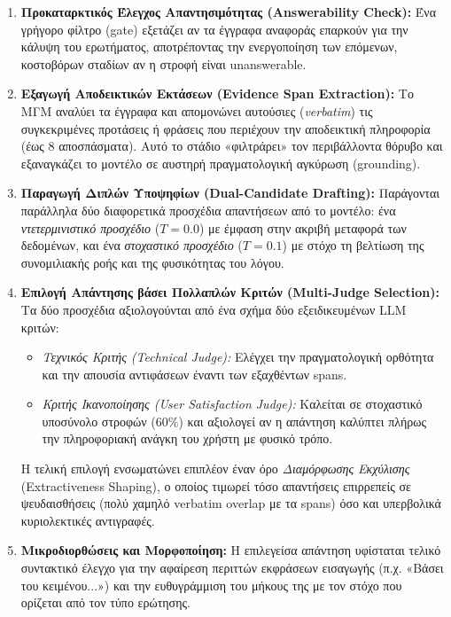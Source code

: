 \begin{enumerate}
    \item \textbf{Προκαταρκτικός Έλεγχος Απαντησιμότητας (Answerability Check):} Ένα γρήγορο φίλτρο (gate) εξετάζει αν τα έγγραφα αναφοράς επαρκούν για την κάλυψη του ερωτήματος, αποτρέποντας την ενεργοποίηση των επόμενων, κοστοβόρων σταδίων αν η στροφή είναι unanswerable.
    \item \textbf{Εξαγωγή Αποδεικτικών Εκτάσεων (Evidence Span Extraction):} Το ΜΓΜ αναλύει τα έγγραφα και απομονώνει αυτούσιες (\textit{verbatim}) τις συγκεκριμένες προτάσεις ή φράσεις που περιέχουν την αποδεικτική πληροφορία (έως 8 αποσπάσματα). Αυτό το στάδιο «φιλτράρει» τον περιβάλλοντα θόρυβο και εξαναγκάζει το μοντέλο σε αυστηρή πραγματολογική αγκύρωση (grounding).
    \item \textbf{Παραγωγή Διπλών Υποψηφίων (Dual-Candidate Drafting):} Παράγονται παράλληλα δύο διαφορετικά προσχέδια απαντήσεων από το μοντέλο: ένα \textit{ντετερμινιστικό προσχέδιο} ($T{=}0.0$) με έμφαση στην ακριβή μεταφορά των δεδομένων, και ένα \textit{στοχαστικό προσχέδιο} ($T{=}0.1$) με στόχο τη βελτίωση της συνομιλιακής ροής και της φυσικότητας του λόγου.
    \item \textbf{Επιλογή Απάντησης βάσει Πολλαπλών Κριτών (Multi-Judge Selection):} Τα δύο προσχέδια αξιολογούνται από ένα σχήμα δύο εξειδικευμένων LLM κριτών:
    \begin{itemize}
        \item \textit{Τεχνικός Κριτής (Technical Judge):} Ελέγχει την πραγματολογική ορθότητα και την απουσία αντιφάσεων έναντι των εξαχθέντων spans.
        \item \textit{Κριτής Ικανοποίησης (User Satisfaction Judge):} Καλείται σε στοχαστικό υποσύνολο στροφών ($60\%$) και αξιολογεί αν η απάντηση καλύπτει πλήρως την πληροφοριακή ανάγκη του χρήστη με φυσικό τρόπο.
    \end{itemize}
    Η τελική επιλογή ενσωματώνει επιπλέον έναν όρο \textit{Διαμόρφωσης Εκχύλισης} (Extractiveness Shaping), ο οποίος τιμωρεί τόσο απαντήσεις επιρρεπείς σε ψευδαισθήσεις (πολύ χαμηλό verbatim overlap με τα spans) όσο και υπερβολικά κυριολεκτικές αντιγραφές.
    \item \textbf{Μικροδιορθώσεις και Μορφοποίηση:} Η επιλεγείσα απάντηση υφίσταται τελικό συντακτικό έλεγχο για την αφαίρεση περιττών εκφράσεων εισαγωγής (π.χ. «Βάσει του κειμένου...») και την ευθυγράμμιση του μήκους της με τον στόχο που ορίζεται από τον τύπο ερώτησης.
\end{enumerate}

